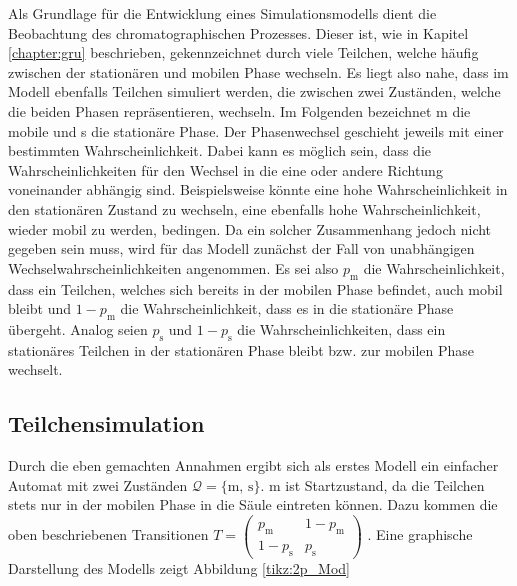 Als Grundlage für die Entwicklung eines Simulationsmodells dient die Beobachtung des chromatographischen Prozesses. Dieser ist, wie in Kapitel \ref{chapter:gru} beschrieben, gekennzeichnet durch viele Teilchen, welche häufig zwischen der stationären und mobilen Phase wechseln. Es liegt also nahe, dass im Modell ebenfalls Teilchen simuliert werden, die zwischen zwei Zuständen, welche die beiden Phasen repräsentieren, wechseln. Im Folgenden bezeichnet m die mobile und s die stationäre Phase. Der Phasenwechsel geschieht jeweils mit einer bestimmten Wahrscheinlichkeit. Dabei kann es möglich sein, dass die Wahrscheinlichkeiten für den Wechsel in die eine oder andere Richtung voneinander abhängig sind. Beispielsweise könnte eine hohe Wahrscheinlichkeit in den stationären Zustand zu wechseln, eine ebenfalls hohe Wahrscheinlichkeit, wieder mobil zu werden, bedingen. Da ein solcher Zusammenhang jedoch nicht gegeben sein muss, wird für das Modell zunächst der Fall von unabhängigen Wechselwahrscheinlichkeiten angenommen. Es sei also $p_{\text {m}}$ die Wahrscheinlichkeit, dass ein Teilchen, welches sich bereits in der mobilen Phase befindet, auch mobil bleibt und $1-p_{\text {m}}$ die Wahrscheinlichkeit, dass es in die stationäre Phase übergeht. Analog seien $p_{\text {s}}$ und $1-p_{\text {s}}$ die Wahrscheinlichkeiten, dass ein stationäres Teilchen in der stationären Phase bleibt bzw. zur mobilen Phase wechselt. 

\subsection{Teilchensimulation}
Durch die eben gemachten Annahmen ergibt sich als erstes Modell ein einfacher Automat mit zwei Zuständen $\mathcal{Q} = \{\text{m, s}\}$. m ist Startzustand, da die Teilchen stets nur in der mobilen Phase in die Säule eintreten können. Dazu kommen die oben beschriebenen Transitionen $T= 
\begin{pmatrix}
p_{\text {m}} & 1-p_{\text {m}} \\
1-p_{\text {s}} & p_{\text {s}} 
\end{pmatrix}
$ .
Eine graphische Darstellung des Modells zeigt Abbildung \ref{tikz:2p_Mod} %

